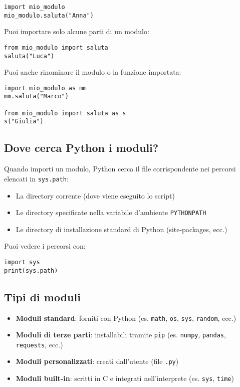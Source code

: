 \documentclass[a4paper,12pt]{article}
\begin{document}
\begin{lstlisting}
import mio_modulo
mio_modulo.saluta("Anna")
\end{lstlisting}

Puoi importare solo alcune parti di un modulo:

\begin{lstlisting}
from mio_modulo import saluta
saluta("Luca")
\end{lstlisting}

Puoi anche rinominare il modulo o la funzione importata:

\begin{lstlisting}
import mio_modulo as mm
mm.saluta("Marco")

from mio_modulo import saluta as s
s("Giulia")
\end{lstlisting}

\subsection*{Dove cerca Python i moduli?}
Quando importi un modulo, Python cerca il file corrispondente nei percorsi elencati in \texttt{sys.path}:

\begin{itemize}
    \item La directory corrente (dove viene eseguito lo script)
    \item Le directory specificate nella variabile d'ambiente \texttt{PYTHONPATH}
    \item Le directory di installazione standard di Python (site-packages, ecc.)
\end{itemize}

Puoi vedere i percorsi con:

\begin{lstlisting}
import sys
print(sys.path)
\end{lstlisting}

\subsection*{Tipi di moduli}
\begin{itemize}
    \item \textbf{Moduli standard}: forniti con Python (es. \texttt{math}, \texttt{os}, \texttt{sys}, \texttt{random}, ecc.)
    \item \textbf{Moduli di terze parti}: installabili tramite \texttt{pip} (es. \texttt{numpy}, \texttt{pandas}, \texttt{requests}, ecc.)
    \item \textbf{Moduli personalizzati}: creati dall'utente (file \texttt{.py})
    \item \textbf{Moduli built-in}: scritti in C e integrati nell'interprete (es. \texttt{sys}, \texttt{time})
\end{itemize}
\end{document}
